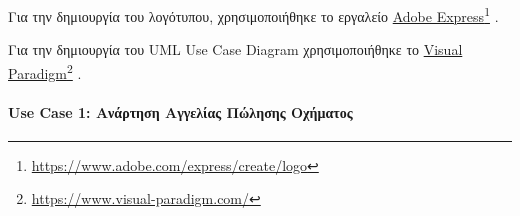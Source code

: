 \documentclass{../ol-softwaremanual}
\newcommand{\doclink}[2]{\href{#1}{#2}\footnote{\url{#1}}}
\begin{document}
	Για την δημιουργία του λογότυπου, χρησιμοποιήθηκε το εργαλείο \en \doclink{https://www.adobe.com/express/create/logo}{Adobe Express} . \gr \break
	
	Για την δημιουργία του \en UML Use Case Diagram \gr χρησιμοποιήθηκε το \en \doclink{https://www.visual-paradigm.com/}{Visual Paradigm} . \gr \break 
	
	\newpage
	
	
	\paragraph{\en Use Case 1: \gr Ανάρτηση Αγγελίας Πώλησης Οχήματος}
	
	\begin{enumerate}
		

\end{enumerate}
\end{document}
